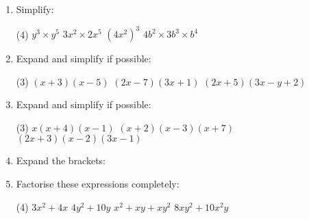 \documentclass[fleqn]{article}
\begin{document}
\begin{enumerate}
    \item Simplify:
        \begin{tasks}(4) %
            \task $y^3 \times y^5$                    %
            \task $3x^2 \times 2x^5$                  %
            \task $(4x^2)^3$                          %
            \task $4b^2 \times 3b^3 \times b^4$       %
        \end{tasks}
        
    \item Expand and simplify if possible:
        \begin{tasks}(3) %
            \task $(x+3)(x-5)$
            \task $(2x-7)(3x+1)$
            \task $(2x+5)(3x-y+2)$
        \end{tasks}
        
    \item Expand and simplify if possible:
        \begin{tasks}(3) %
            \task $x(x+4)(x-1)$                       %
            \task $(x+2)(x-3)(x+7)$                   %
            \task $(2x+3)(x-2)(3x-1)$                 %
        \end{tasks}
        
    \item Expand the brackets: \vspace{3mm}\\\hspace*{1mm} %
        
    \item Factorise these expressions completely:
        \begin{tasks}(4) %
            \task $3x^2+4x$             %
            \task $4y^2+10y$            %
            \task $x^2+xy+xy^2$         %
            \task $8xy^2+10x^2y$        %
        \end{tasks}
        

\end{enumerate}
\end{document}
